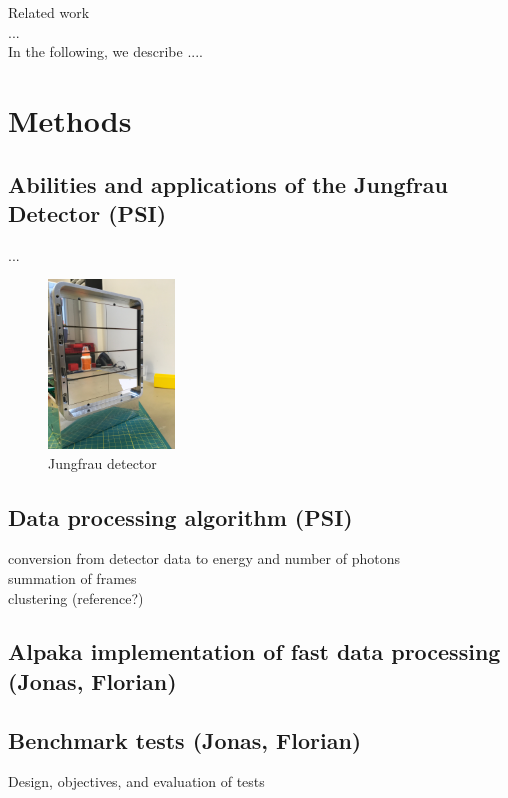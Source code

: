 \documentclass[a4paper]{article}
\begin{document}
Related work\\

...\\

In the following, we describe ....\\


\section{Methods}
\subsection{Abilities and applications of the Jungfrau Detector (PSI)}

...




\begin{figure}[h!]
\centering
\includegraphics[width=0.30\textwidth]{jungfraudetector.jpg}
\caption{Jungfrau detector}
\label{fig:jfdetector}
\end{figure}


\subsection{Data processing algorithm (PSI)}
conversion from detector data to energy and number of photons\\

 summation of frames\\

 clustering (reference?)\\

\subsection{Alpaka implementation of fast data processing (Jonas, Florian)}


\subsection{Benchmark tests (Jonas, Florian)}
Design, objectives, and evaluation of tests
\end{document}
